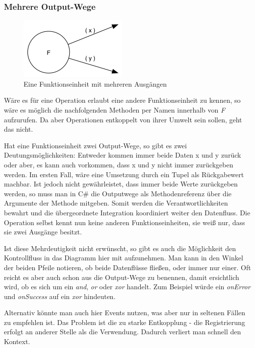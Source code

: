\subsubsection{Mehrere Output-Wege}

\begin{figure}[H]
	\centering
	\includegraphics[width=.5\linewidth]{./img/diagramOut2.png}
	\caption{Eine Funktionseinheit mit mehreren Ausgängen}
\end{figure}



Wäre es für eine Operation erlaubt eine andere Funktionseinheit zu kennen, so
wäre es möglich die nachfolgenden Methoden per Namen innerhalb von \emph{F}
aufzurufen. Da aber Operationen entkoppelt von ihrer Umwelt sein sollen, geht das nicht.

Hat eine Funktionseinheit zwei Output-Wege, so gibt es zwei
Deutungsmöglichkeiten: Entweder kommen immer beide Daten x und y zurück oder
aber, es kann auch vorkommen, dass x und y nicht immer zurückgeben werden.
Im ersten Fall, wäre eine Umsetzung durch ein Tupel als Rückgabewert machbar.
Ist jedoch nicht gewährleistet, dass immer beide Werte zurückgeben werden, so
muss man in C\# die Outputwege als Methodenreferenz über die Argumente der Methode mitgeben. Somit werden die Verantwortlichkeiten bewahrt und die übergeordnete Integration koordiniert weiter den Datenfluss. Die Operation selbst kennt nun keine
anderen Funktionseinheiten, sie weiß nur, dass sie zwei Ausgänge besitzt.

Ist diese Mehrdeutigkeit nicht erwünscht, so gibt es auch die Möglichkeit den Kontrollfluss in das Diagramm hier mit aufzunehmen. Man kann in den Winkel der beiden Pfeile notieren, ob beide
Datenflüsse fließen, oder immer nur einer. 
Oft reicht es aber auch schon aus die Output-Wege zu benennen, damit ersichtlich
wird, ob es sich um ein \emph{and}, \emph{or} oder \emph{xor} handelt. Zum Beispiel würde ein \emph{onError}
und \emph{onSuccess} auf ein \emph{xor} hindeuten.

Alternativ könnte man auch hier Events nutzen,  was aber nur in seltenen Fällen zu empfehlen ist. Das Problem ist die zu starke Entkopplung - die Registrierung erfolgt an anderer Stelle als die Verwendung. Dadurch verliert man schnell den Kontext.


